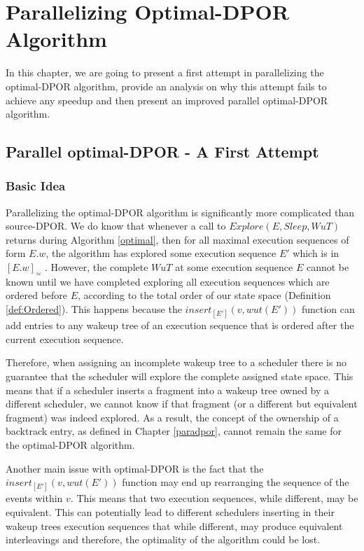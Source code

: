 \chapter{Parallelizing Optimal-DPOR Algorithm}
\label{paradpor_opt}

In this chapter, we are going to present a first attempt in parallelizing the optimal-DPOR
algorithm, provide an analysis on why this attempt fails to achieve any speedup and then present 
an improved parallel optimal-DPOR algorithm.


\section{Parallel optimal-DPOR - A First Attempt}

\subsection{Basic Idea}

Parallelizing the optimal-DPOR algorithm is significantly more complicated than source-DPOR. We do know that whenever a call to 
$Explore(E, Sleep, WuT)$ returns during Algorithm \ref{optimal}, then for all maximal execution sequences
of form $E.w$, the algorithm has explored some execution sequence $E'$ which is in $[E.w]_\simeq$ \cite{AbdullaAronisJohnssonSagonasDPOR2014}.
However, the complete $WuT$ at some execution sequence $E$ cannot be known until we have completed
exploring all execution sequences which are ordered before $E$, according to the total order of our state space
(Definition \ref{def:Ordered}). This happens because the $insert_{[E']}(v,wut(E'))$ function can add
entries to any wakeup tree of an execution sequence that is ordered after the current execution sequence.

Therefore, when assigning an incomplete wakeup tree to a scheduler there is no
guarantee that the scheduler will explore the complete assigned state space. This means that if a
scheduler inserts a fragment into a wakeup tree owned by a different scheduler, we cannot know if that 
fragment (or a different but equivalent fragment) was indeed explored. As a result, the concept of the ownership of a 
backtrack entry, as defined in Chapter \ref{paradpor}, cannot remain the same for the optimal-DPOR algorithm.

Another main issue with optimal-DPOR is the fact that the $insert_{[E']}(v,wut(E'))$ function may end up
rearranging the sequence of the events within $v$. This means that two execution sequences, while different,
may be equivalent. This can potentially lead to different schedulers inserting in their
wakeup trees execution sequences that while different, may produce equivalent interleavings and therefore, the optimality
of the algorithm could be lost.

